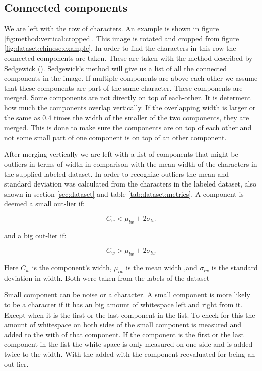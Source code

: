 \subsection{Connected components}

We are left with the row of characters. An example is shown in figure \ref{fig:method:vertical:cropped}. This image is rotated and cropped from figure \ref{fig:dataset:chinese:example}. In order to find the characters in this row the connected components are taken. These are taken with the method described by Sedgewick (\cite{Sedgewick}). Sedgewick's method will give us a list of all the connected components in the image. If multiple components are above each other we assume that these components are part of the same character. These components are merged. Some components are not directly on top of each-other. It is determent how much the components overlap vertically. If the overlapping width is larger or the same as $0.4$ times the width of the smaller of the two components, they are merged. This is done to make sure the components are on top of each other and not some small part of one component is on top of an other component.

After merging vertically we are left with a list of components that might be outliers in terms of width in comparison with the mean width of the characters in the supplied labeled dataset. In order to recognize outliers the mean and standard deviation was calculated from the characters in the labeled dataset, also shown in section \ref{sec:dataset} and table \ref{tab:dataset:metrics}. A component is deemed a small out-lier if:

\begin{equation}
C_w < \mu_{lw} + 2 \sigma_{lw} 
\end{equation}

\noindent and a big out-lier if:

\begin{equation}
C_w > \mu_{lw} + 2 \sigma_{lw} 
\end{equation}

Here $C_w$ is the component's width, $\mu_{lw}$ is the mean width ,and $\sigma_{lw}$ is the standard deviation in width. Both were taken from the labels of the dataset

Small component can be noise or a character. A small component is more likely to be a character if it has an big amount of whitespace left and right from it. Except when it is the first or the last component in the list. To check for this the amount of whitespace on both sides of the small component is measured and added to the with of that component. If the component is the first or the last component in the list the white space is only measured on one side and is added twice to the width. With the added with the component reevaluated for being an out-lier.

